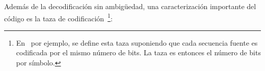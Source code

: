 \begin{figure}[h!]
%
\begin{center}  \end{center}
%
%
\label{Fig:SZ:ClasesCodigos}
\end{figure}

Adem\'as  de   la  decodificaci\'on  sin   ambig\"uedad,  una  caracterizaci\'on
importante del  c\'odigo es la  taza de codificaci\'on~\footnote{En~\cite{Rio07}
  por  ejemplo, se  define esta  taza suponiendo  que cada  secuencia  fuente es
  codificada por el  mismo n\'umero de bits. La taza es  entonces el n\'umero de
  bits por s\'imbolo.}:
%
